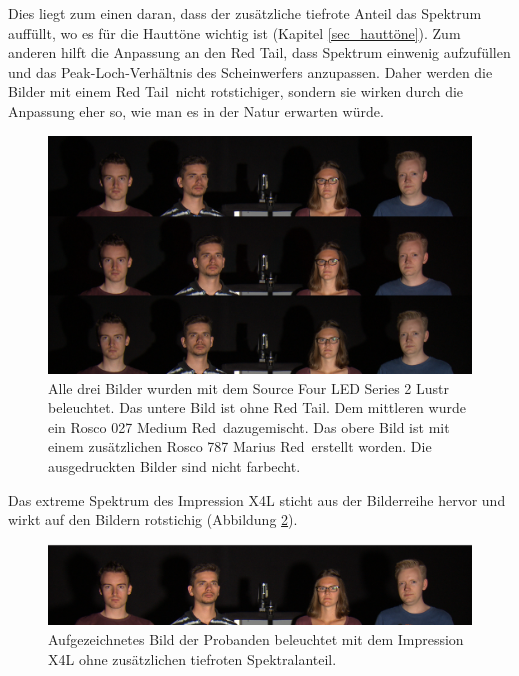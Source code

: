 Dies liegt zum einen daran, dass der zusätzliche tiefrote Anteil das Spektrum auffüllt, wo es für die Hauttöne wichtig ist (Kapitel \ref{sec_hauttöne}).
Zum anderen hilft die Anpassung an den \glqq Red Tail\grqq , dass Spektrum einwenig aufzufüllen und das Peak-Loch-Verhältnis des Scheinwerfers anzupassen. Daher werden die Bilder mit einem \glqq Red Tail\grqq\ nicht rotstichiger, sondern sie wirken durch die Anpassung eher so, wie man es in der Natur erwarten würde.

\begin{figure}[H]     %
\centering
\includegraphics[width=1.0\textwidth]{bilder/vergleich} 
\caption {Alle drei Bilder wurden mit dem Source Four LED Series 2 Lustr beleuchtet. Das untere Bild ist ohne \glqq Red Tail\grqq . Dem mittleren wurde ein Rosco 027 \glqq Medium Red\grqq\ dazugemischt. Das obere Bild ist mit einem zusätzlichen Rosco 787 \glqq Marius Red\grqq\ erstellt worden. Die ausgedruckten Bilder sind nicht farbecht.} \label{b_vergleich}
\end{figure}

Das extreme Spektrum des Impression X4L sticht aus der Bilderreihe hervor und wirkt auf den Bildern rotstichig (Abbildung \ref{b_umfrageglpbild}). 

\begin{figure}[H]     %
\centering
\includegraphics[width=1.0\textwidth]{bilder/umfrageglpbild} 
\caption {Aufgezeichnetes Bild der Probanden beleuchtet mit dem Impression X4L ohne zusätzlichen tiefroten Spektralanteil.} \label{b_umfrageglpbild}
\end{figure}

